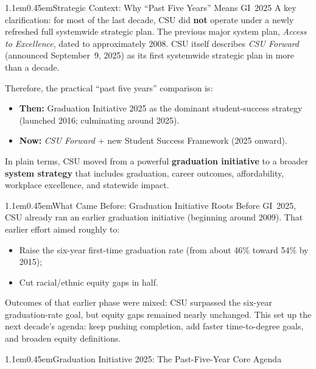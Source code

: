 \documentclass[11pt,letterpaper]{article}
\makeatletter
\renewcommand\section{\@startsection{section}{1}{\z@}%
  {1.1em}{0.45em}{\large\bfseries}}
\makeatother
\begin{document}
\section{Strategic Context: Why ``Past Five Years'' Means GI~2025}
A key clarification: for most of the last decade, CSU did \textbf{not} operate under a newly refreshed full systemwide strategic plan. The previous major system plan, \textit{Access to Excellence}, dated to approximately 2008. CSU itself describes \textit{CSU Forward} (announced September~9, 2025) as its first systemwide strategic plan in more than a decade.

Therefore, the practical ``past five years'' comparison is:
\begin{itemize}
  \item \textbf{Then:} Graduation Initiative 2025 as the dominant student-success strategy (launched 2016; culminating around 2025).
  \item \textbf{Now:} \textit{CSU Forward} + new Student Success Framework (2025 onward).
\end{itemize}
In plain terms, CSU moved from a powerful \textbf{graduation initiative} to a broader \textbf{system strategy} that includes graduation, career outcomes, affordability, workplace excellence, and statewide impact.

\section{What Came Before: Graduation Initiative Roots}
Before GI~2025, CSU already ran an earlier graduation initiative (beginning around 2009). That earlier effort aimed roughly to:
\begin{itemize}
  \item Raise the six-year first-time graduation rate (from about 46\% toward 54\% by 2015);
  \item Cut racial/ethnic equity gaps in half.
\end{itemize}
Outcomes of that earlier phase were mixed: CSU surpassed the six-year graduation-rate goal, but equity gaps remained nearly unchanged. This set up the next decade's agenda: keep pushing completion, add faster time-to-degree goals, and broaden equity definitions.

\section{Graduation Initiative 2025: The Past-Five-Year Core Agenda}
\end{document}

